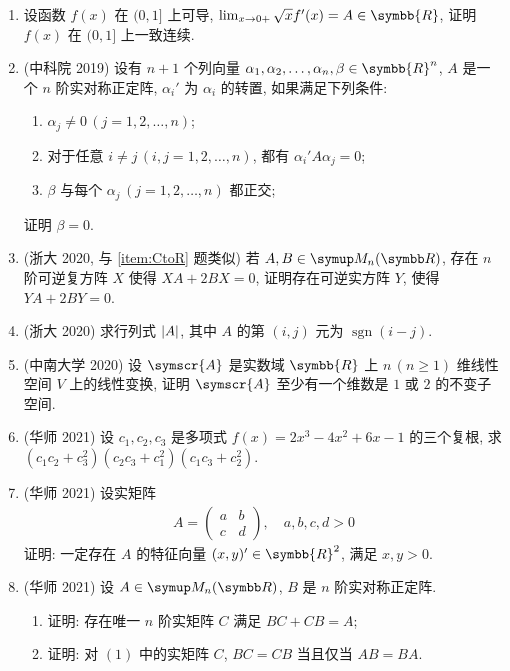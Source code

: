\documentclass{ctexart}
\let\ge\geqslant
\newcommand{\limit}[2]{\lim_{#1 \to #2}}
\newcommand{\R}{\ensuremath{\symbb{R}}}
\DeclareMathOperator{\sgn}{sgn}
\begin{document}
\begin{enumerate}[resume=exer]
        \item 设函数 $ f(x) $ 在 $ (0, 1] $ 上可导, $ \limit{x}{0+} \sqrt{x}f'(x) = A\in \R $, 证明 $ f(x) $ 在 $ (0, 1] $ 上一致连续.
        \item (中科院 2019) 设有 $ n + 1 $ 个列向量 $ \alpha_{1}, \alpha_{2}, \dots, \alpha_{n}, \beta \in \R^{n} $, $ A $ 是一个 $ n $ 阶实对称正定阵, $ \alpha_{i}' $ 为 $ \alpha_{i} $ 的转置, 如果满足下列条件: 
        \begin{enumerate}
            \item $ \alpha_{j} \ne 0\, (j = 1, 2, \dots, n) $;
            \item 对于任意 $ i \ne j \,(i, j = 1, 2, \dots, n) $, 都有 $ \alpha_{i}' A \alpha_{j} = 0 $;
            \item $ \beta $ 与每个 $ \alpha_{j}\,(j = 1, 2, \dots, n) $ 都正交; 
        \end{enumerate}
        证明 $ \beta = 0 $.
        \item (浙大 2020, 与 \ref{item:CtoR} 题类似) 若 $ A, B \in \MM $, 存在 $ n $ 阶可逆复方阵 $ X $ 使得 $ XA + 2BX = 0 $, 证明存在可逆实方阵 $ Y $, 使得 $ YA + 2BY = 0 $. 
        \item (浙大 2020) 求行列式 $ \abs{A} $, 其中 $ A $ 的第 $ (i, j) $ 元为 $ \sgn(i - j) $.
        \item (中南大学 2020) 设 $ \symscr{A} $ 是实数域 $ \R $ 上 $ n\,(n\ge 1) $ 维线性空间 $ V $ 上的线性变换, 证明 $ \symscr{A} $ 至少有一个维数是 $ 1 $ 或 $ 2 $ 的不变子空间.
        \item (华师 2021) 设 $ c_{1}, c_{2}, c_{3} $ 是多项式 $ f(x) = 2x^{3} - 4x^{2} + 6x - 1 $ 的三个复根, 求 $ (c_{1}c_{2} + c_{3}^{2})(c_{2}c_{3} + c_{1}^{2})(c_{1}c_{3} + c_{2}^{2}) $.
        \item (华师 2021) 设实矩阵
        \begin{align*}
            A = \begin{pmatrix}
                a & b \\ c & d
            \end{pmatrix},\quad a, b, c, d > 0
        \end{align*}
        证明: 一定存在 $ A $ 的特征向量 $ (x, y)'\in \R^{2} $, 满足 $ x, y > 0 $.
        \item (华师 2021) 设 $ A \in \MM $, $ B $ 是 $ n $ 阶实对称正定阵. 
        \begin{enumerate}
            \item 证明: 存在唯一 $ n $ 阶实矩阵 $ C $ 满足 $ BC + CB = A $;
            \item 证明: 对 $ (1) $ 中的实矩阵 $ C $, $ BC = CB $ 当且仅当 $ AB = BA $. 
        \end{enumerate}
    \end{enumerate}
\end{document}
